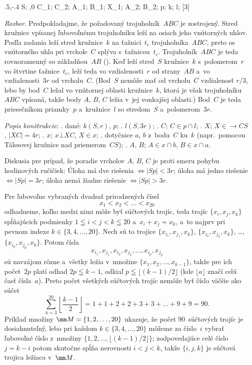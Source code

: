 {%
\fontplace
\rbpoint\xy.5,-.4 S; \bpoint{},0 C_1; \lpoint C_2;
\tpoint A_1; \tpoint B_1; \tpoint X_1; \bpoint A_2; \tpoint B_2;
\rpoint p; \lBpoint k; \rBpoint l;
[3] \hfil\Obr

{\it Rozbor\/}.
Predpokladajme, že požadovaný trojuholník~$ABC$ je zostrojený.
Stred kružnice vpísanej ľubovoľnému trojuholníku leží na osiach
jeho vnútorných uhlov. Podľa zadania leží stred kružnice~$k$
na ťažnici~$t_c$ trojuholníka~$ABC$, preto os vnútorného uhla pri
vrchole~$C$ splýva s~ťažnicou~$t_c$. Trojuholník~$ABC$ je teda
rovnoramenný so základňou~$AB$ (\obr). Keď leží stred~$S$ kružnice~$k$
s~polomerom~$r$ vo štvrtine ťažnice~$t_c$, leží teda vo
vzdialenosti~$r$ od strany~$AB$ a~vo vzdialenosti~$3r$ od vrcholu~$C$.
(Bod~$S$ nemôže mať od vrcholu~$C$ vzdialenosť $r/3$,
lebo by bod~$C$ ležal vo vnútornej oblasti kružnice~$k$, ktorá je
však trojuholníku~$ABC$ vpísaná, takže body $A$, $B$, $C$ ležia
v~jej vonkajšej oblasti.) Bod~$C$ je teda priesečníkom priamky~$p$
a~kružnice~$l$ so stredom~$S$ a~polomerom~$3r$.
\inspicture{}

\noindent
{\it Popis konštrukcie\/}:
.  dané: $k(S,r)$, $p$;
.  $l(S,3r)$;
.  $C$; $ C\in p\cap l$;
.  $X$; $X\in\to CS$, $|XC|= 4r$;
.  $x$; $x\bot XC$, $ X\in x$;
.  dotyčnice $a$, $b$ z~bodu~$C$ ku~$k$ (napr.~pomocou
        Tálesovej kružnice nad priemerom~$CS$);
.  $A$, $B$; $ A\in x\cap b$, $ B\in x\cap a$.

\noindent
Diskusia pre prípad, že poradie vrcholov $A$, $B$, $C$ je proti
smeru pohybu hodinových ručičiek:
\ite{} Úloha má dve riešenia  $\iff  |Sp| < 3r$;
\ite{} úloha má jedno riešenie  $\iff  |Sp| = 3r$;
\ite{} úloha nemá žiadne riešenie $ \iff  |Sp| > 3r$.}

{%
Pre ľubovoľne vybraných dvadsať prirodzených čísel
$$
x_1<x_2<\dots<x_{20}
$$
odhadneme, koľko medzi nimi môže byť súčtových trojíc, teda
trojíc $\{x_i,x_j,x_k\}$ spĺňajúcich podmienky $1\leqq
i<j<k\leqq20$ 
a~$x_i+x_j=x_k$, a~to najprv
pri pevnom indexe $k\in\{3,4,\dots,20\}$. Nech sú to trojice
$\{x_{i_1},x_{j_1},x_k\}$, $\{x_{i_2},x_{j_2},x_k\}$, \dots,
$\{x_{i_p},x_{j_p},x_k\}$. Potom čísla
$$
x_{i_1},x_{j_1},x_{i_2},x_{j_2},\dots,x_{i_p},x_{j_p}
$$
sú navzájom rôzne a~všetky ležia v~množine
$\{x_1,x_2,\dots,x_{k-1}\}$, takže pre
ich počet~$2p$ platí odhad $2p\leqq k-1$, odkiaľ
$p\leqq\lfloor(k-1)/2\rfloor$ (kde $\lfloor a\rfloor$ značí celú časť čísla~$a$).
Preto počet všetkých súčtových trojíc nemôže byť číslo väčšie ako
súčet
$$
\sum_{k=3}^{20}\left\lfloor\frac{k-1}{2}\right\rfloor=
1+1+2+2+3+3+\dots+9+9=90.
$$
Príklad množiny $\mm M=\{1,2,\dots,20\}$ ukazuje, že počet $90$~súčtových
trojíc je dosiahnuteľný, lebo pri každom
$k\in\{3,4,\dots,20\}$ môžeme za číslo~$i$ vybrať ľubovoľné číslo
z~množiny $\{1,2,\dots,\lfloor(k-1)/2\rfloor\}$; zodpovedajúce celé číslo
$j=k-i$ potom skutočne spĺňa nerovnosti $i<j<k$, takže
$\{i,j,k\}$ je súčtová trojica ležiaca v~$\mm M$.}

